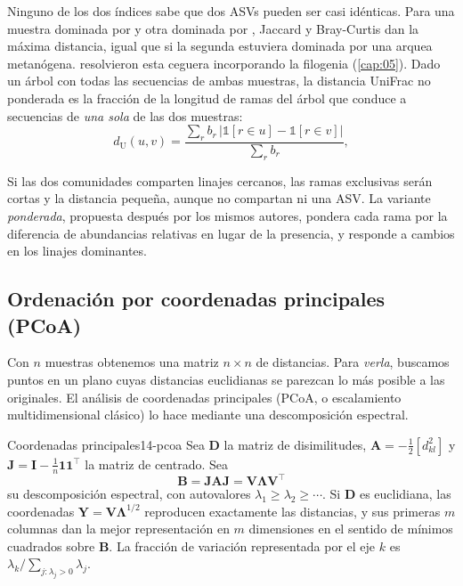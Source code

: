 Ninguno de los dos índices sabe que dos ASVs pueden ser casi idénticas. Para una muestra dominada por  y otra dominada por , Jaccard y Bray-Curtis dan la máxima distancia, igual que si la segunda estuviera dominada por una arquea metanógena. \textcite{c14-lozupone2005} resolvieron esta ceguera incorporando la filogenia (\cref{cap:05}). Dado un árbol con todas las secuencias de ambas muestras, la distancia UniFrac no ponderada es la fracción de la longitud de ramas del árbol que conduce a secuencias de \emph{una sola} de las dos muestras:
\begin{equation}\label{eq:14-unifrac}
d_{\text{U}}(u,v) = \frac{\sum_{r} b_r\, \bigl|\mathbb{1}[r \in u] - \mathbb{1}[r \in v]\bigr|}{\sum_{r} b_r},
\end{equation}

\begin{simbolos}
\end{simbolos}

Si las dos comunidades comparten linajes cercanos, las ramas exclusivas serán cortas y la distancia pequeña, aunque no compartan ni una ASV. La variante \emph{ponderada}, propuesta después por los mismos autores, pondera cada rama por la diferencia de abundancias relativas en lugar de la presencia, y responde a cambios en los linajes dominantes.

\subsection{Ordenación por coordenadas principales (PCoA)}

Con $n$ muestras obtenemos una matriz $n\times n$ de distancias. Para \emph{verla}, buscamos puntos en un plano cuyas distancias euclidianas se parezcan lo más posible a las originales. El análisis de coordenadas principales (PCoA, o escalamiento multidimensional clásico) lo hace mediante una descomposición espectral.

\begin{teorema}{Coordenadas principales}{14-pcoa}
Sea $\mathbf{D}$ la matriz de disimilitudes, $\mathbf{A} = -\tfrac12 [d_{kl}^2]$ y $\mathbf{J} = \mathbf{I} - \tfrac1n \mathbf{1}\mathbf{1}^{\top}$ la matriz de centrado. Sea
\begin{equation}\label{eq:14-gower}
\mathbf{B} = \mathbf{J}\mathbf{A}\mathbf{J} = \mathbf{V}\boldsymbol{\Lambda}\mathbf{V}^{\top}
\end{equation}
su descomposición espectral, con autovalores $\lambda_1 \ge \lambda_2 \ge \cdots$. Si $\mathbf{D}$ es euclidiana, las coordenadas $\mathbf{Y} = \mathbf{V}\boldsymbol{\Lambda}^{1/2}$ reproducen exactamente las distancias, y sus primeras $m$ columnas dan la mejor representación en $m$ dimensiones en el sentido de mínimos cuadrados sobre $\mathbf{B}$. La fracción de variación representada por el eje $k$ es $\lambda_k / \sum_{j:\lambda_j>0}\lambda_j$.
\end{teorema}

